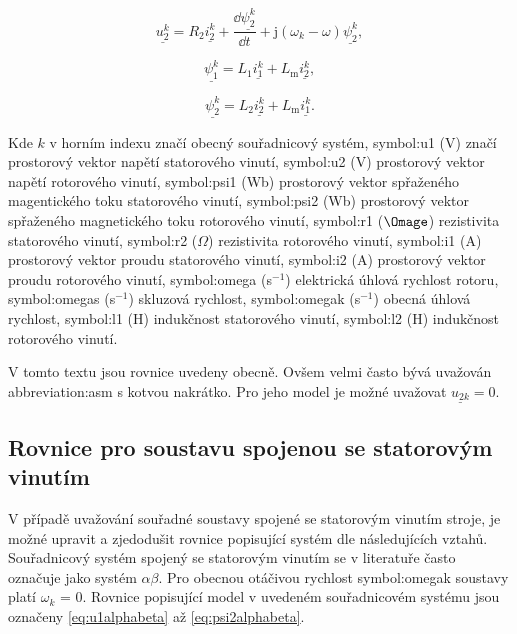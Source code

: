 \documentclass[a4paper, twoside, 11pt]{article}
\begin{document}
    \begin{equation}
        \underline{u_{2}^{k}} = R_2 \underline{i_2^{k}} + \frac{\dd{\underline{\psi_2^{k}}}}{\dd{t}} + \text{j} (\omega_k - \omega) \underline{\psi_2^{k}},
    \end{equation}

    \begin{equation}
        \underline{\psi_1^{k}} = L_1 \underline{i_1^{k}} + L_\text{m} \underline{i_2^{k}},
    \end{equation}

    \begin{equation}
        \underline{\psi_2^{k}} = L_2 \underline{i_2^{k}} + L_\text{m} \underline{i_1^{k}}.
    \end{equation}

    Kde $k$ v horním indexu značí obecný souřadnicový systém, \gls{symbol:u1} (V) značí prostorový vektor napětí statorového vinutí, \gls{symbol:u2} (V) prostorový vektor napětí rotorového vinutí, \gls{symbol:psi1} (Wb) prostorový vektor spřaženého magentického toku statorového vinutí, \gls{symbol:psi2} (Wb) prostorový vektor spřaženého magnetického toku rotorového vinutí, \gls{symbol:r1} ($\Omage$) rezistivita statorového vinutí, \gls{symbol:r2} ($\Omega$) rezistivita rotorového vinutí, \gls{symbol:i1} (A) prostorový vektor proudu statorového vinutí, \gls{symbol:i2} (A) prostorový vektor proudu rotorového vinutí, \gls{symbol:omega} (s$^{-1}$) elektrická úhlová rychlost rotoru, \gls{symbol:omegas} (s$^{-1}$) skluzová rychlost, \gls{symbol:omegak} (s$^{-1}$) obecná úhlová rychlost, \gls{symbol:l1} (H) indukčnost statorového vinutí, \gls{symbol:l2} (H) indukčnost rotorového vinutí.\par

    V tomto textu jsou rovnice uvedeny obecně. Ovšem velmi často bývá uvažován \gls{abbreviation:asm} s kotvou nakrátko. Pro jeho model je možné uvažovat $\underline{u_{2k}} = 0$.\par


    \subsection{Rovnice pro soustavu spojenou se statorovým vinutím}
    V případě uvažování souřadné soustavy spojené se statorovým vinutím stroje, je možné upravit a zjedodušit rovnice popisující systém dle následujících vztahů. Souřadnicový systém spojený se statorovým vinutím se v literatuře často označuje jako systém $\alpha\beta$. Pro obecnou otáčivou rychlost \gls{symbol:omegak} soustavy platí $\omega_k$ = 0. Rovnice popisující model v uvedeném souřadnicovém systému jsou označeny \ref{eq:u1alphabeta} až \ref{eq:psi2alphabeta}.
\end{document}
